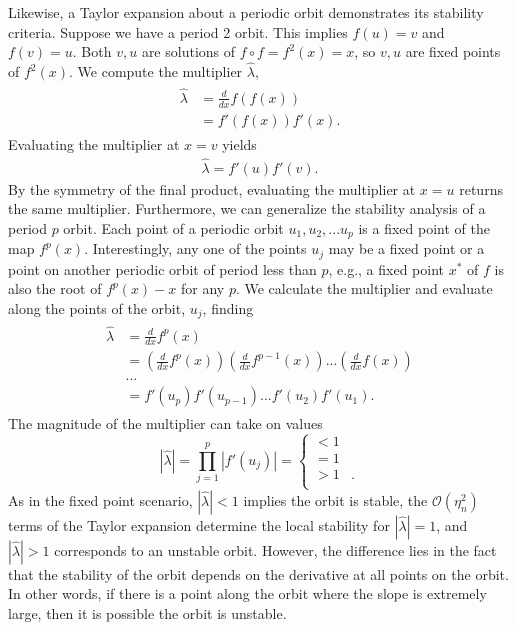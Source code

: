 Likewise, a Taylor expansion about a periodic orbit demonstrates its
stability criteria. Suppose we have a period 2 orbit. This implies
$f(u)=v$ and $f(v)=u$. Both $v,u$ are solutions of $f \circ
f= f^2(x) = x$, so $v,u$ are fixed points of $f^2(x)$. We compute the
multiplier $\hat{\lambda}$,
\begin{align*}
\begin{split}
\hat{\lambda} &= \frac{d}{dx} f(f(x)) \\
&= f'(f(x))f'(x).
\end{split}
\end{align*}
Evaluating the multiplier at $x=v$ yields
\begin{align*}
\hat{\lambda} = f'(u)f'(v).
\end{align*}
By the symmetry of the final product, evaluating the multiplier at
$x=u$ returns the same multiplier. Furthermore, we can generalize the
stability analysis of a period $p$ orbit. Each point of a
periodic orbit $u_1,u_2,...u_p$ is a fixed point of the map
$f^p(x)$. Interestingly, any one of the points $u_j$ may be a fixed point or a point
on another periodic orbit of period less than $p$, e.g., a fixed
point $x^*$ of $f$ is also the root of $f^p(x)-x$ for any $p$. We
calculate the multiplier and evaluate along the points of the orbit,
$u_j$, finding
\begin{align*}
\begin{split}
\hat{\lambda} &= \frac{d}{dx} f^p(x) \\
&= \left(\frac{d}{dx} f^p(x)\right) \left(\frac{d}{dx} f^{p-1}(x)\right) ... \left(\frac{d}{dx} f(x)\right)\\
&...\\
&= f'(u_p)f'(u_{p-1})...f'(u_{2})f'(u_{1}).
\end{split}
\end{align*}
The magnitude of the multiplier can take on values
\begin{displaymath}
|\hat{\lambda}| =  \prod_{j = 1}^{p}|f'(u_j)| =\left\{
     \begin{array}{lr}
       <1 & \\
       =1 & \\
       >1 & .\\
     \end{array}
   \right.
\end{displaymath} 
As in the fixed point scenario, $|\hat{\lambda}|<1$ implies the orbit
is stable, the $\mathcal{O}(\eta_n^2)$ terms of the Taylor
expansion determine the local stability for $|\hat{\lambda}|=1$, and $|\hat{\lambda}|>1$ corresponds to an unstable
orbit. However, the difference lies in the fact that the
stability of the orbit depends on the derivative at all points on the
orbit. In other words, if there is a point along the orbit where the
slope is extremely large, then it is possible the orbit is unstable. 

